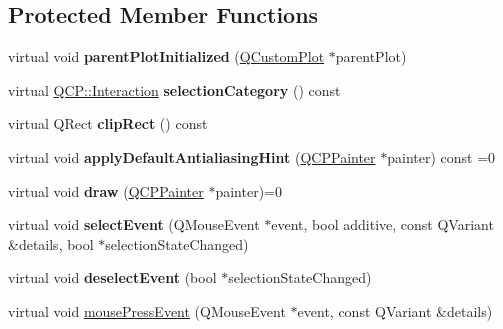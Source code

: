 \subsection*{Protected Member Functions}
\begin{DoxyCompactItemize}
\item 
\mbox{\label{class_q_c_p_layerable_ab20b7dbd8e0249ed61adb9622c427382}} 
virtual void {\bfseries parent\+Plot\+Initialized} (\hyperlink{class_q_custom_plot}{Q\+Custom\+Plot} $\ast$parent\+Plot)
\item 
\mbox{\label{class_q_c_p_layerable_a908c9edda761886f33893be326dab77d}} 
virtual \hyperlink{namespace_q_c_p_a2ad6bb6281c7c2d593d4277b44c2b037}{Q\+C\+P\+::\+Interaction} {\bfseries selection\+Category} () const
\item 
\mbox{\label{class_q_c_p_layerable_acbcfc9ecc75433747b1978a77b1864b3}} 
virtual Q\+Rect {\bfseries clip\+Rect} () const
\item 
\mbox{\label{class_q_c_p_layerable_afdf83ddc6a265cbf4c89fe99d3d93473}} 
virtual void {\bfseries apply\+Default\+Antialiasing\+Hint} (\hyperlink{class_q_c_p_painter}{Q\+C\+P\+Painter} $\ast$painter) const =0
\item 
\mbox{\label{class_q_c_p_layerable_adf62b4bac3ca934db80290792fc897e1}} 
virtual void {\bfseries draw} (\hyperlink{class_q_c_p_painter}{Q\+C\+P\+Painter} $\ast$painter)=0
\item 
\mbox{\label{class_q_c_p_layerable_a7498c2d0d081cf7cad0fb3bb93aa0e91}} 
virtual void {\bfseries select\+Event} (Q\+Mouse\+Event $\ast$event, bool additive, const Q\+Variant \&details, bool $\ast$selection\+State\+Changed)
\item 
\mbox{\label{class_q_c_p_layerable_ae546370644a5551c76af739afc008bee}} 
virtual void {\bfseries deselect\+Event} (bool $\ast$selection\+State\+Changed)
\item 
virtual void \hyperlink{class_q_c_p_layerable_af6567604818db90f4fd52822f8bc8376}{mouse\+Press\+Event} (Q\+Mouse\+Event $\ast$event, const Q\+Variant \&details)
\item 

\end{DoxyCompactItemize}
